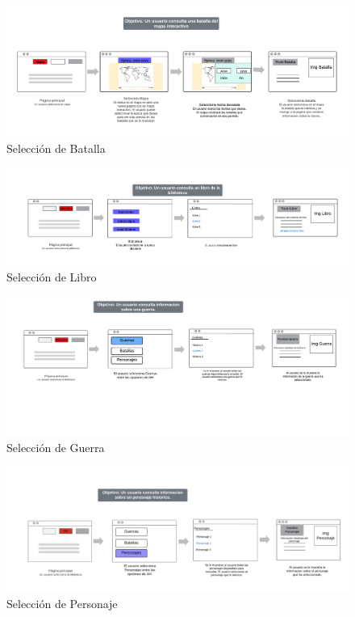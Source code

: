 \documentclass{article}
\begin{document}
\begin{figure}[H]
    \centering
    \includegraphics[width=1\textwidth]{Storyboards/StoryBoard_seleccion_batalla.png}
    \caption{Selección de Batalla}
    \label{fig:mi_imagen}
\end{figure}

\begin{figure}[H]
    \centering
    \includegraphics[width=1\textwidth]{Storyboards/StoryBoard_seleccion_libro.png}
    \caption{Selección de Libro}
    \label{fig:mi_imagen}
\end{figure}

\begin{figure}[H]
    \centering
    \includegraphics[width=1\textwidth]{Storyboards/StoryBoard_seleccion_guerra.png}
    \caption{Selección de Guerra}
    \label{fig:mi_imagen}
\end{figure}

\begin{figure}[H]
    \centering
    \includegraphics[width=1\textwidth]{Storyboards/StoryboardPersonaje.jpg}
    \caption{Selección de Personaje}
    \label{fig:mi_imagen}
\end{figure}
\end{document}
